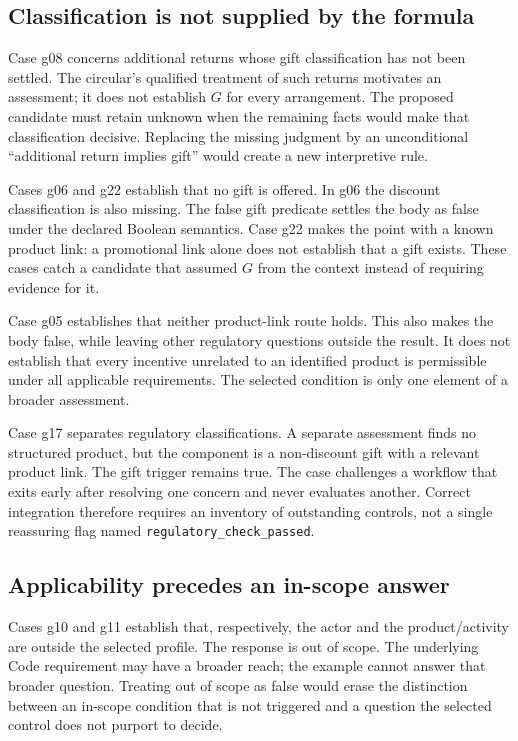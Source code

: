 \documentclass[12pt,a4paper,oneside,openany]{book}
\begin{document}
\subsection{Classification is not supplied by the formula}
Case g08 concerns additional returns whose gift classification has not been
settled. The circular's qualified treatment of such returns motivates an
assessment; it does not establish $G$ for every arrangement. The proposed
candidate must retain unknown when the remaining facts would make that
classification decisive. Replacing the missing judgment by an unconditional
``additional return implies gift'' would create a new interpretive rule.

Cases g06 and g22 establish that no gift is offered. In g06 the discount
classification is also missing. The false gift predicate settles the body as
false under the declared Boolean semantics. Case g22 makes the point with a
known product link: a promotional link alone does not establish that a gift
exists. These cases catch a candidate that assumed $G$ from the context instead
of requiring evidence for it.

Case g05 establishes that neither product-link route holds. This also makes the
body false, while leaving other regulatory questions outside the result. It
does not establish that every incentive unrelated to an identified product is
permissible under all applicable requirements. The selected condition is only
one element of a broader assessment.

Case g17 separates regulatory classifications. A separate assessment finds no
structured product, but the component is a non-discount gift with a relevant
product link. The gift trigger remains true. The case challenges a workflow
that exits early after resolving one concern and never evaluates another.
Correct integration therefore requires an inventory of outstanding controls,
not a single reassuring flag named \texttt{regulatory\_check\_passed}.

\subsection{Applicability precedes an in-scope answer}
Cases g10 and g11 establish that, respectively, the actor and the product/activity
are outside the selected profile. The response is out of scope. The underlying
Code requirement may have a broader reach; the example cannot answer that
broader question. Treating out of scope as false would erase the distinction
between an in-scope condition that is not triggered and a question the selected
control does not purport to decide.
\end{document}
